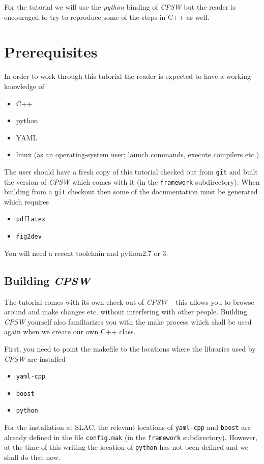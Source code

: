 \documentclass[10pt]{article}
\newcommand{\ita}[1]{\emph{#1}}
\newcommand{\cpsw}      {\ita {CPSW}}
\newcommand{\git}       {{\tt{}git}}
\newcommand{\py}        {python}
\newcommand{\cpp}       {C++}
\newcommand{\cod}[1] {{\tt#1}}
\begin{document}
For the tutorial we will use the {\em \py} binding of \cpsw{} but the reader
is encouraged to try to reproduce some of the steps in \cpp{} as well.

\section{Prerequisites}
In order to work through this tutorial the reader is expected to have a working
knowledge of
\begin{itemize}
  \item \cpp{}
  \item \py
  \item YAML
  \item linux (as an operating-system user; launch commands, execute compilers etc.)
\end{itemize}

The user should have a fresh copy of this tutorial checked out from \git{} and built
the version of \cpsw{} which comes with it (in the \cod{framework} subdirectory).
When building from a \git{} checkout then some of the documentation must
be generated which requires
\begin{itemize}
  \item \cod{pdflatex}
  \item \cod{fig2dev}
\end{itemize}

You will need a recent toolchain and \py{}2.7 or 3.

\subsection{Building \cpsw}
The tutorial comes with its own check-out of \cpsw{} -- this allows you to browse 
around and make changes etc. without interfering with other people. Building \cpsw{}
yourself also familiarizes you with the make process which shall be used again
when we create our own \cpp{} class.

First, you need to point the makefile to the locations where the libraries used by
\cpsw{} are installed
\begin{itemize}
\item \cod{yaml-cpp}
\item \cod{boost}
\item \cod{\py}
\end{itemize}
For the installation at SLAC, the relevant locations of \cod{yaml-cpp} and \cod{boost}
are already defined in the file \cod{config.mak} (in the \cod{framework} subdirectory).
However, at the time of this writing the location of \cod{\py} has not been defined
and we shall do that now.
\end{document}
